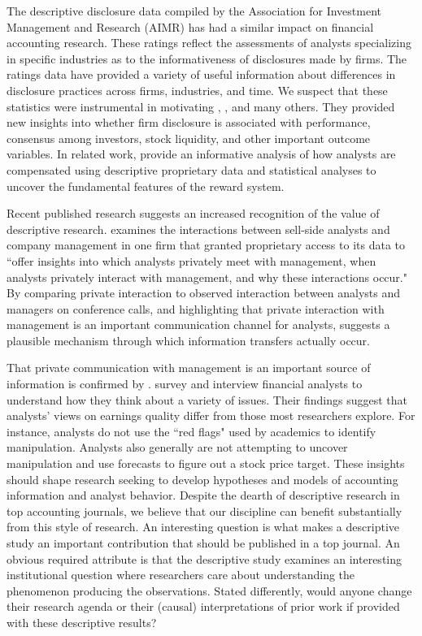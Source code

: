 \documentclass[12pt,reqno,titlepage]{amsart}
\theoremstyle{definition}
\begin{document}
\begin{doublespace}
The descriptive disclosure data compiled by the Association for Investment Management and Research (AIMR) has had a similar impact on financial accounting research. 
These ratings reflect the assessments of analysts specializing in specific industries as to the informativeness of disclosures made by firms.
The ratings data have provided a variety of useful information about differences in disclosure practices across firms, industries, and time.
We suspect that these statistics were instrumental in motivating \citet{Lang:1993iv,Lang:1996dk}, \cite{Healy:1999ig}, and many others. They provided new insights into whether firm disclosure is associated with performance, consensus among investors, stock liquidity, and other important outcome variables.
In related work, \cite{Groysberg:2011dk} provide an informative analysis of how analysts are compensated using descriptive proprietary data and statistical analyses to uncover the fundamental features of the reward system.

Recent published research suggests an increased recognition of the value of descriptive research. 
\citet{Soltes:2013ba} examines the interactions between sell-side analysts and company management in one firm that granted proprietary access to its data to ``offer insights into which analysts privately meet with management, when analysts privately interact with management, and why these interactions occur."
By comparing private interaction to observed interaction between analysts and managers on conference calls, and highlighting that private interaction with management is an important communication channel for analysts, \citet{Soltes:2013ba} suggests a plausible mechanism through which information transfers actually occur. 

That private communication with management is an important source of information is confirmed by \citet{Brown:2015kd}. 
\citet{Brown:2015kd} survey and interview financial analysts to understand how they think about a variety of issues. 
Their findings suggest that analysts' views on earnings quality differ from those most researchers explore. 
For instance, analysts do not use the ``red flags" used by academics to identify manipulation. 
Analysts also generally are not attempting to uncover manipulation and use forecasts to figure out a stock price target. 
These insights should shape research seeking to develop hypotheses and models of accounting information and analyst behavior. 
Despite the dearth of descriptive research in top accounting journals, we believe that our discipline can benefit substantially from this style of research. 
An interesting question is what makes a descriptive study an important contribution that should be published in a top journal.
An obvious required attribute is that the descriptive study examines an interesting institutional question where researchers care about understanding the phenomenon producing the observations.
Stated differently, would anyone change their research agenda or their (causal) interpretations of prior work if provided with these descriptive results?


\end{doublespace}
\end{document}
